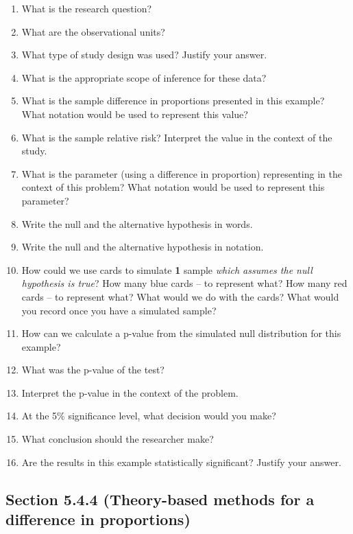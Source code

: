 \documentclass[
]{report}
\newcommand{\rgs}{\vspace{12pt}} %
\begin{document}
\begin{enumerate}
\def\labelenumi{\arabic{enumi}.}
\item
  What is the research question?
  \rgs
\item
  What are the observational units?
  \rgs
\item
  What type of study design was used? Justify your answer.
  \rgs
\item
  What is the appropriate scope of inference for these data?
  \rgs
\item
  What is the sample difference in proportions presented in this example? What notation would be used to represent this value?
  \rgs
\item
  What is the sample relative risk? Interpret the value in the context of the study.
  \rgs
\item
  What is the parameter (using a difference in proportion) representing in the context of this problem? What notation would be used to represent this parameter?
  \rgs
  \rgs
\item
  Write the null and the alternative hypothesis in words.
  \rgs
  \rgs
\item
  Write the null and the alternative hypothesis in notation.
  \rgs
\item
  How could we use cards to simulate \textbf{1} sample \emph{which assumes the null hypothesis is true}? How many blue cards -- to represent what? How many red cards -- to represent what? What would we do with the cards? What would you record once you have a simulated sample?
  \rgs
  \rgs
\item
  How can we calculate a p-value from the simulated null distribution for this example?
  \rgs
  \rgs
\item
  What was the p-value of the test?
  \rgs
\item
  Interpret the p-value in the context of the problem.
  \rgs
  \rgs
\item
  At the 5\% significance level, what decision would you make?
  \rgs
\item
  What conclusion should the researcher make?
  \rgs
\item
  Are the results in this example statistically significant? Justify your answer.
  \rgs
\end{enumerate}

\hypertarget{section-5.4.4-theory-based-methods-for-a-difference-in-proportions}{%
\subsection*{Section 5.4.4 (Theory-based methods for a difference in proportions)}\label{section-5.4.4-theory-based-methods-for-a-difference-in-proportions}}
\end{document}
